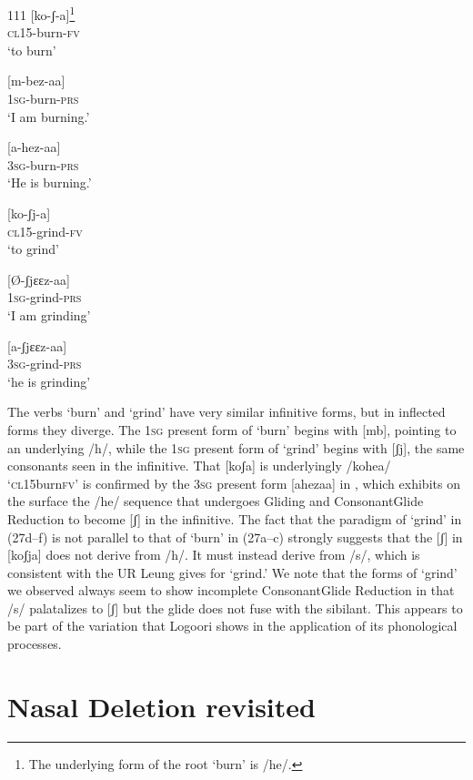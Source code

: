 \documentclass[output=paper]{langsci/langscibook}
\begin{document}
\begin{tabular}{111}
\ea\label{ex:glewwe:27}{}
  \ea\label{ex:glewwe:27a}
 [ko-ʃ{}-a]\footnote{The underlying form of the root ‘burn’ is /he/.} \\{}
\textsc{cl15}-burn-\textsc{fv}\\{}
\glt ‘to burn’

\ex\label{ex:glewwe:27b}{}
 [m-bez-aa]\\{}
\textsc{1sg}-burn-\textsc{prs}\\{}
\glt ‘I am burning.’


\ex\label{ex:glewwe:27c}{}
 [a-hez-aa]\\{}
\textsc{3sg}-burn-\textsc{prs}\\{}
\glt ‘He is burning.’


\ex\label{ex:glewwe:27d}{}
 [ko-ʃj-a]\\{}
\textsc{cl15}-grind-\textsc{fv}\\{}
\glt ‘to grind’


\ex\label{ex:glewwe:27e}{}
 [Ø-ʃjɛɛz-aa]\\{}
\textsc{1sg}-grind-\textsc{prs}\\{}
\glt ‘I am grinding’


\ex\label{ex:glewwe:27f}{}
 [a-ʃjɛɛz-aa]\\{}
\textsc{3sg}-grind-\textsc{prs}\\{}
\glt ‘he is grinding’
\z
\z

The verbs ‘burn’ and ‘grind’ have very similar infinitive forms, but in inflected forms they diverge. The 1\textsc{sg} present form of ‘burn’ begins with [mb], pointing to an underlying /h/, while the 1\textsc{sg} present form of ‘grind’ begins with [ʃj], the same consonants seen in the infinitive. That [koʃa] is underlyingly /kohea/ ‘\textsc{cl}15burn\textsc{fv’} is confirmed by the 3\textsc{sg} present form [ahezaa] in , which exhibits on the surface the /he/ sequence that undergoes Gliding and ConsonantGlide Reduction to become [ʃ] in the infinitive. The fact that the paradigm of ‘grind’ in (27d–f) is not parallel to that of ‘burn’ in (27a–c) strongly suggests that the [ʃ] in [koʃja] does not derive from /h/. It must instead derive from /s/, which is consistent with the UR Leung gives for ‘grind.’ We note that the forms of ‘grind’ we observed always seem to show incomplete ConsonantGlide Reduction in that /s/ palatalizes to [ʃ] but the glide does not fuse with the sibilant. This appears to be part of the variation that Logoori shows in the application of its phonological processes.

\section{Nasal Deletion revisited}


\end{tabular}
\end{document}
